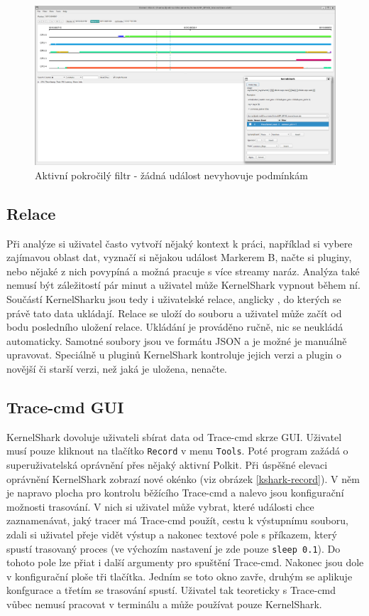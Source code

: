 \begin{figure}[p]\centering
    \includegraphics[width=140mm]{img/KernelShark/kshark-advfilter-in-effect}
    \caption{Aktivní pokročilý filtr - žádná událost nevyhovuje podmínkám}
    \label{kshark-advfiltering}
\end{figure}

\subsection*{Relace}
Při analýze si uživatel často vytvoří nějaký kontext k práci, například si vybere zajímavou oblast dat, vyznačí si nějakou událost Markerem B, načte si pluginy, nebo nějaké z nich povypíná a možná pracuje s více streamy naráz. Analýza také nemusí být záležitostí pár minut a uživatel může KernelShark vypnout během ní. Součástí KernelSharku jsou tedy i uživatelské relace, anglicky , do kterých se právě tato data ukládají. Relace se uloží do souboru a uživatel může začít od bodu posledního uložení relace. Ukládání je prováděno ručně, nic se neukládá automaticky. Samotné soubory jsou ve formátu JSON a je možné je manuálně upravovat. Speciálně u pluginů KernelShark kontroluje jejich verzi a plugin o novější či starší verzi, než jaká je uložena, nenačte.

\subsection*{Trace-cmd GUI}

KernelShark dovoluje uživateli sbírat data od Trace-cmd skrze GUI. Uživatel musí pouze kliknout na tlačítko \texttt{Record} v menu \texttt{Tools}. Poté program zažádá o superuživatelská oprávnění přes nějaký aktivní Polkit. Při úspěšné elevaci oprávnění KernelShark zobrazí nové okénko (viz obrázek  \ref{kshark-record}). V něm je napravo plocha pro kontrolu běžícího Trace-cmd a nalevo jsou konfigurační možnosti trasování. V nich si uživatel může vybrat, které události chce zaznamenávat, jaký tracer má Trace-cmd použít, cestu k výstupnímu souboru, zdali si uživatel přeje vidět výstup a nakonec textové pole s příkazem, který spustí trasovaný proces (ve výchozím nastavení je zde pouze \texttt{sleep 0.1}). Do tohoto pole lze přiat i další argumenty pro spuštění Trace-cmd. Nakonec jsou dole v konfigurační ploše tři tlačítka. Jedním se toto okno zavře, druhým se aplikuje konfgurace a třetím se trasování spustí. Uživatel tak teoreticky s Trace-cmd vůbec nemusí pracovat v terminálu a může používat pouze KernelShark.

